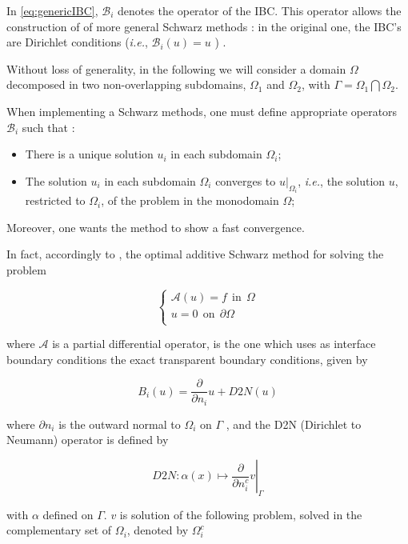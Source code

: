 \indent In \eqref{eq:genericIBC}, $\mathcal{B}_i$ denotes the operator of the IBC. This operator allows the construction of of more general Schwarz methods : in the original one, the IBC's are Dirichlet conditions (\emph{i.e.}, $\mathcal{B}_i(u) = u$  ) \cite{Japhet2003,Lions1990}.

\indent Without loss of generality, in the following we will consider a domain $\Omega$ decomposed in two non-overlapping subdomains, $\Omega_1$ and $\Omega_2$, with $\Gamma = \Omega_1 \bigcap \Omega_2$.

\indent When implementing a Schwarz methods, one must define appropriate operators $\mathcal{B}_i$ such that :

\begin{itemize}
\begingroup \item There is a unique solution $u_i$ in each subdomain $\Omega_i$; \endgroup
\item The solution $u_i$ in each subdomain $\Omega_i$ converges to $u|_{\Omega_i}$, \emph{i.e.}, the solution $u$, restricted to $\Omega_i$, of the problem in the monodomain $\Omega$;
\end{itemize} 

\indent Moreover, one wants the method to show a fast convergence.

\indent In fact, accordingly to \cite{Japhet2003}, the optimal additive Schwarz method for solving the problem 

\begin{equation*}
\begin{cases}
\mathcal{A}(u) = f \ \ \text{in} \ \ \Omega\\
u = 0 \ \ \text{on} \ \ \partial\Omega\\
\end{cases}
\end{equation*}

\noindent where $\mathcal{A}$ is a partial differential operator, is the one which uses as interface boundary conditions the exact transparent boundary conditions, given by

$$B_i(u) = \frac{\partial}{\partial n_i}u + D2N(u)$$

\noindent where $\partial n_i$ is the outward normal to $\Omega_i$ on $\Gamma$ , and the D2N (Dirichlet to Neumann) operator is defined by

$$\left. D2N : \alpha(x) \mapsto \frac{\partial}{\partial n_i^c}v \right\rvert_\Gamma$$

\noindent with $\alpha$ defined on $\Gamma$. $v$ is solution of the following problem, solved in the complementary set of $\Omega_i$, denoted by $\Omega_i^c$

